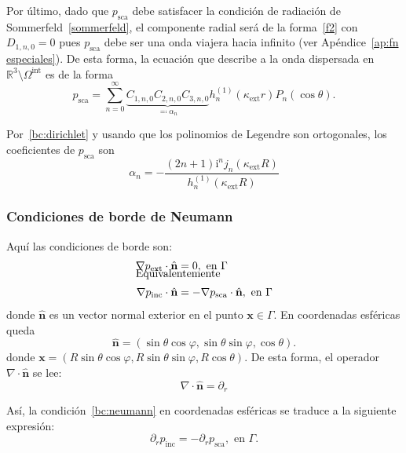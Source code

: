 \documentclass[11pt]{article}
\numberwithin{equation}{section}
\def\R{\mathbb{R}}
\def\x{\textbf{x}}
\def\n{\hat{\textbf{n}}}
\let\i\relax
\def\i{\mathrm{i}}
\def\exterior{\textrm{ext}}
\def\interior{\textrm{int}}
\def\inc{\textrm{inc}}
\def\sca{\textrm{sca}}
\begin{document}
Por último, dado que \(p_{\sca}\) debe satisfacer la condición de radiación de
Sommerfeld~\eqref{sommerfeld}, el componente radial será de la forma~\eqref{f2}
con \(D_{1,n,0} = 0\) pues \(p_{\sca}\) debe ser una onda viajera hacia infinito (ver
Apéndice~\ref{ap:fn especiales}). De esta forma, la ecuación que
describe a la onda dispersada en \(\R^3\setminus\Omega^{\interior}\) es de la
forma
\begin{equation}\label{psca:forma}
	p_{\sca}
	=
	\sum_{n=0}^{\infty}
	\underbrace{C_{1,n,0} C_{2,n,0} C_{3,n,0}}_{\eqqcolon \alpha_n}
		h^{(1)}_{n}(\kappa_{\exterior} r)
		P_{n}(\cos\theta)
.\end{equation}

\noindent Por~\eqref{bc:dirichlet} y usando que los polinomios de Legendre son
ortogonales, los coeficientes de \(p_{\sca}\) son
\begin{equation}\label{ext:psca:coef:dirichlet}
	\alpha_n 
	= 
	-\frac
	{
		(2n+1)\i^n j_n(\kappa_{\exterior} R)
	}
	{
		h^{(1)}_{n} (\kappa_{\exterior} R)
	}
\end{equation}

\subsubsection{Condiciones de borde de Neumann}\label{sssec:a:exterior:neumann}

\noindent Aquí las condiciones de borde son:
\begin{align}
\label{bc:neumann}
	\nabla p_{\exterior}\cdot \n &= 0, \text{ en }
	\Gamma\\[-1em]
	\intertext{Equivalentemente}
	\nabla p_{\inc}\cdot \n &= -\nabla p_{\sca}\cdot \n, \text{ en }
	\Gamma
\end{align}
donde \(\n\) es un vector normal exterior en el punto \(\x\in\Gamma\). En coordenadas
esféricas queda
\begin{equation}\label{n}
	\n = (\sin\theta\cos\varphi, \sin\theta\sin\varphi, \cos\theta).
\end{equation}
donde \(\x = (R\sin\theta\cos\varphi, R\sin\theta\sin\varphi, R\cos\theta)\).
De esta forma, el operador \(\nabla\cdot\n\) se lee:
\begin{equation}
\label{nabla.n}
	\nabla\cdot\n = \partial_{r}
\end{equation}

\noindent Así, la condición~\eqref{bc:neumann} en coordenadas esféricas
se traduce a la siguiente expresión:
\begin{equation}\label{neumann:esfericas}
	\partial_{r} p_{\inc} = - \partial_{r} p_{\sca}, \text{ en } \Gamma.
\end{equation}
\end{document}
